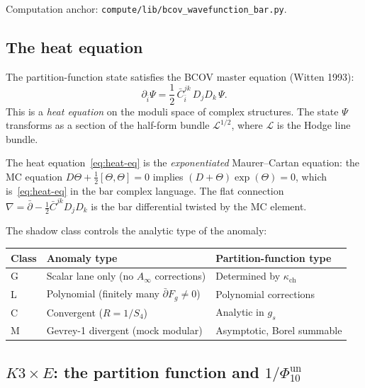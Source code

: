 \documentclass[11pt]{amsart}
\theoremstyle{plain}
\theoremstyle{definition}
\theoremstyle{remark}
\begin{document}
\noindent
Computation anchor: \texttt{compute/lib/bcov\_wav\allowbreak efunction\_bar.py}.

\subsection{The heat equation}
\label{sub:bcov-heat}

The partition-function state satisfies the BCOV master equation (Witten 1993):
\begin{equation}\label{eq:heat-eq}
 \partial_{\bar{i}} \Psi = \frac{1}{2}\, \bar{C}^{jk}_{\bar{i}}\,
 D_j D_k\, \Psi.
\end{equation}
This is a \emph{heat equation} on the moduli space of complex
structures. The state $\Psi$ transforms as a section of the
half-form bundle $\mathcal{L}^{1/2}$, where $\mathcal{L}$ is the
Hodge line bundle.

The heat equation~\eqref{eq:heat-eq} is the \emph{exponentiated}
Maurer--Cartan equation: the MC equation
$D\Theta + \frac{1}{2}[\Theta, \Theta] = 0$ implies
$(D + \Theta) \exp(\Theta) = 0$, which is~\eqref{eq:heat-eq} in
the bar complex language. The flat connection
$\nabla = \bar{\partial} - \frac{1}{2} \bar{C}^{jk} D_j D_k$
is the bar differential twisted by the MC element.

The shadow class controls the analytic type of the anomaly:
\begin{center}
\renewcommand{\arraystretch}{1.4}
\begin{tabular}{lll}
 \hline
 \textbf{Class} & \textbf{Anomaly type} & \textbf{Partition-function type} \\
 \hline
 G & Scalar lane only (no $A_\infty$ corrections) & Determined by $\kappa_{\mathrm{ch}}$ \\
 L & Polynomial (finitely many $\bar{\partial} F_g \neq 0$) & Polynomial corrections \\
 C & Convergent ($R = 1/S_4$) & Analytic in $g_s$ \\
 M & Gevrey-1 divergent (mock modular) & Asymptotic, Borel summable \\
 \hline
\end{tabular}
\end{center}

\subsection{$K3 \times E$: the partition function and $1/\Phi_{10}^{\mathrm{un}}$}
\label{sub:partition-function-k3xe}
\end{document}
